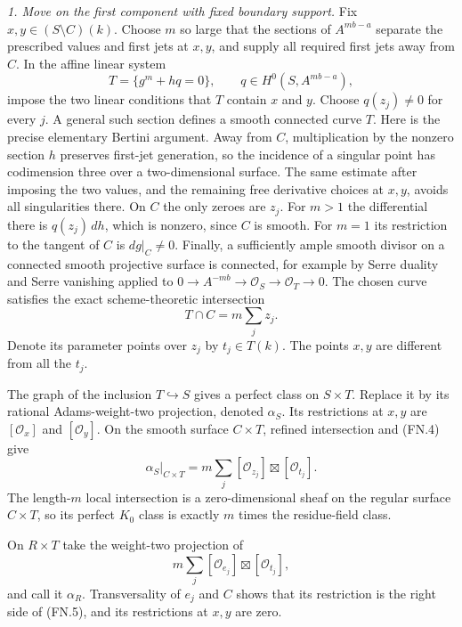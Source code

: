\emph{1. Move on the first component with fixed boundary support.}
Fix $x,y\in(S\setminus C)(k)$. Choose $m$ so large that the
sections of $A^{mb-a}$ separate the prescribed values and first
jets at $x,y$, and supply all required first jets away from $C$.
In the affine linear system
\begin{equation}
             T=\{g^m+hq=0\},\qquad
               q\in H^0(S,A^{mb-a}),                 \tag{FN.3}
\end{equation}
impose the two linear conditions that $T$ contain $x$ and $y$.
Choose $q(z_j)\ne0$ for every $j$. A general such section defines
a smooth connected curve $T$. Here is the precise elementary
Bertini argument. Away from $C$, multiplication by the nonzero
section $h$ preserves first-jet generation, so the incidence of
a singular point has codimension three over a two-dimensional
surface. The same estimate after imposing the two values, and
the remaining free derivative choices at $x,y$, avoids all
singularities there. On $C$ the only zeroes are $z_j$. For $m>1$
the differential there is $q(z_j)\,dh$, which is nonzero, since
$C$ is smooth. For $m=1$ its restriction to the tangent of $C$
is $dg|_C\ne0$. Finally, a sufficiently ample smooth divisor
on a connected smooth projective surface is connected, for
example by Serre duality and Serre vanishing applied to
$0\to A^{-mb}\to\mathcal O_S\to\mathcal O_T\to0$.
The chosen curve satisfies the exact scheme-theoretic intersection
\begin{equation}
                     T\cap C=m\sum_jz_j.             \tag{FN.4}
\end{equation}
Denote its parameter points over $z_j$ by $t_j\in T(k)$.
The points $x,y$ are different from all the $t_j$.

The graph of the inclusion $T\hookrightarrow S$ gives a perfect
class on $S\times T$. Replace it by its rational Adams-weight-two
projection, denoted $\alpha_S$. Its restrictions at $x,y$ are
$[\mathcal O_x]$ and $[\mathcal O_y]$. On the smooth surface
$C\times T$, refined intersection and (FN.4) give
\begin{equation}
      \alpha_S|_{C\times T}
           =m\sum_j[\mathcal O_{z_j}]\boxtimes
                             [\mathcal O_{t_j}].      \tag{FN.5}
\end{equation}
The length-$m$ local intersection is a zero-dimensional sheaf
on the regular surface $C\times T$, so its perfect $K_0$ class
is exactly $m$ times the residue-field class.

On $R\times T$ take the weight-two projection of
\[
             m\sum_j[\mathcal O_{e_j}]\boxtimes
                                    [\mathcal O_{t_j}],
\]
and call it $\alpha_R$. Transversality of $e_j$ and $C$ shows
that its restriction is the right side of (FN.5), and its
restrictions at $x,y$ are zero.

